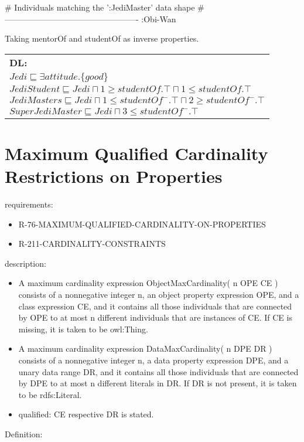 \documentclass{llncs}
\newenvironment{DL}{
  \scriptsize
  \sffamily
  \vspace{0.3cm}
  \begin{tabular}{l}
	\textbf{DL:} \\

}{
  \end{tabular}
  \linebreak
}
\newcommand{\tb}[1]{\todo[size=\small, color=blue!40]{\textbf{Thomas:} #1}}
\begin{document}
\begin{ex}
# Individuals matching the ’:JediMaster’ data shape
# -------------------------------------------------
:Obi-Wan
\end{ex}

\noindent Taking mentorOf and studentOf as inverse properties. \\
\begin{DL}
$Jedi \sqsubseteq \exists attitude.\{good\} $\\
$JediStudent \sqsubseteq Jedi \sqcap 1\geq studentOf.\top \sqcap 1\leq studentOf.\top$ \\
$JediMasters \sqsubseteq Jedi \sqcap 1\leq studentOf^{-}.\top \sqcap 2\geq studentOf^{-}.\top $\\
$SuperJediMaster \sqsubseteq Jedi \sqcap  3\leq studentOf^{-}.\top $
\end{DL}

\section{Maximum Qualified Cardinality Restrictions on Properties}

requirements:

\begin{itemize}
	\item R-76-MAXIMUM-QUALIFIED-CARDINALITY-ON-PROPERTIES
	\item R-211-CARDINALITY-CONSTRAINTS
\end{itemize}

description:

\begin{itemize}
	\item A maximum cardinality expression ObjectMaxCardinality( n OPE CE ) consists of a nonnegative integer n, an object property expression OPE, and a class expression CE, and it contains all those individuals that are connected by OPE to at most n different individuals that are instances of CE. If CE is missing, it is taken to be owl:Thing.
	\item A maximum cardinality expression DataMaxCardinality( n DPE DR ) consists of a nonnegative integer n, a data property expression DPE, and a unary data range DR, and it contains all those individuals that are connected by DPE to at most n different literals in DR. If DR is not present, it is taken to be rdfs:Literal. 
	\item qualified: CE respective DR is stated. 
\end{itemize}
Definition:\\
\end{document}
